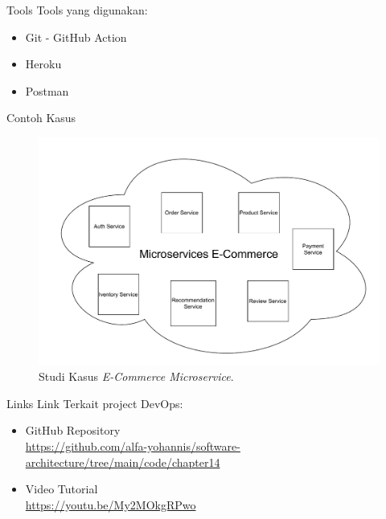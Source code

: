 \documentclass{beamer}
\begin{document}
	\begin{frame}{Tools}
		Tools yang digunakan:
		\begin{itemize}
			\item Git - GitHub Action
			\item Heroku
			\item Postman
		\end{itemize}
	\end{frame}

	\begin{frame}{Contoh Kasus}
		\begin{figure}[h]
			\centering
			\includegraphics[width=\textwidth]{Chapter-14-Studi-Kasus}
			\caption{Studi Kasus \textit{E-Commerce Microservice}.}
			\label{fig:client-server-schema}
		\end{figure}
	
	\end{frame}

	\begin{frame}{Links}
		Link Terkait project DevOps:
		\begin{itemize}
			\item GitHub Repository
				\\ \url{https://github.com/alfa-yohannis/software-architecture/tree/main/code/chapter14}
			\item Video Tutorial
				\\\url{https://youtu.be/My2MOkgRPwo}
		\end{itemize}
	\end{frame}
\end{document}
